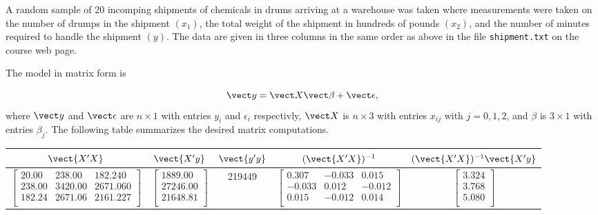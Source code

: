 \documentclass{homework}
\begin{document}
\begin{longproblem}
A random sample of 20 incomping shipments of chemicals in drums arriving at a warehouse was taken where measurements were taken on the number of drumps in the shipment $(x_1)$, the total weight of the shipment in hundreds of pounds $(x_2)$, and the number of minutes required to handle the shipment $(y)$. The data are given in three columns in the same order as above in the file \texttt{shipment.txt} on the course web page.


The model in matrix form is

$$
\vect y = \vect X \vect \beta + \vect \epsilon,
$$
where $\vect y$ and $\vect \epsilon$ are $n \times 1$ with entries $y_i$ and $\epsilon_i$ respectivly, $\vect X$ is $n\times 3$ with entries $x_{ij}$ with $j=0,1,2$, and $\beta$ is $3 \times 1$ with entries $\beta_j$.  The following table summarizes the desired matrix computations.

\renewcommand{\arraystretch}{1.2}
\begin{center}
\begin{tabular}{|c c c c c|}
$\vect{X'X}$ & $\vect{X'y}$ & $\vect{y'y}$ & $(\vect{X'X})^{-1}$ & $(\vect{X'X})^{-1} \vect{X'y}$ \\\hline
$ 
\begin{bmatrix}
 20.00 &  238.00 &  182.240\\
238.00 & 3420.00 & 2671.060\\
182.24 & 2671.06 & 2161.227\\
\end{bmatrix}
$ & $
\begin{bmatrix}
 1889.00 \\
27246.00 \\
21648.81 \\
\end{bmatrix}
$ &
219449
& $
\begin{bmatrix}
 0.307& -0.033&  0.015\\
-0.033&  0.012& -0.012\\
 0.015& -0.012&  0.014\\
\end{bmatrix}
$ & $
\begin{bmatrix}
3.324\\
3.768\\
5.080\\
\end{bmatrix}
$
\end{tabular}
\end{center}


\end{longproblem}
\end{document}
